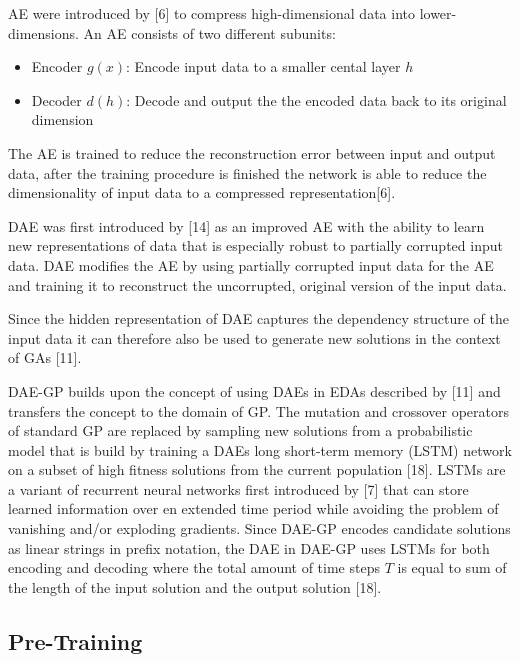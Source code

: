 \documentclass[
  11pt,
]{article}
\providecommand{\tightlist}{%
  \setlength{\itemsep}{0pt}\setlength{\parskip}{0pt}}
\begin{document}
AE were introduced by {[}6{]} to compress high-dimensional data into lower-dimensions. An AE consists of two different subunits:

\begin{itemize}
\tightlist
\item
  Encoder \(g(x)\): Encode input data to a smaller cental layer \(h\)
\item
  Decoder \(d(h)\): Decode and output the the encoded data back to its original dimension
\end{itemize}

The AE is trained to reduce the reconstruction error between input and output data, after the training procedure is finished the network is able to reduce the dimensionality of input data to a compressed representation{[}6{]}.

DAE was first introduced by {[}14{]} as an improved AE with the ability to learn new representations of data that is especially robust to partially corrupted input data. DAE modifies the AE by using partially corrupted input data for the AE and training it to reconstruct the uncorrupted, original version of the input data.

Since the hidden representation of DAE captures the dependency structure of the input data it can therefore also be used to generate new solutions in the context of GAs {[}11{]}.

DAE-GP builds upon the concept of using DAEs in EDAs described by {[}11{]} and transfers the concept to the domain of GP.
The mutation and crossover operators of standard GP are replaced by sampling new solutions from a probabilistic model that is build by training a DAEs long short-term memory (LSTM) network on a subset of high fitness solutions from the current population {[}18{]}.
LSTMs are a variant of recurrent neural networks first introduced by {[}7{]} that can store learned information over en extended time period while avoiding the problem of vanishing and/or exploding gradients. Since DAE-GP encodes candidate solutions as linear strings in prefix notation, the DAE in DAE-GP uses LSTMs for both encoding and decoding where the total amount of time steps \(T\) is equal to sum of the length of the input solution and the output solution {[}18{]}.

\hypertarget{pre-training}{%
\subsection{Pre-Training}\label{pre-training}}
\end{document}
